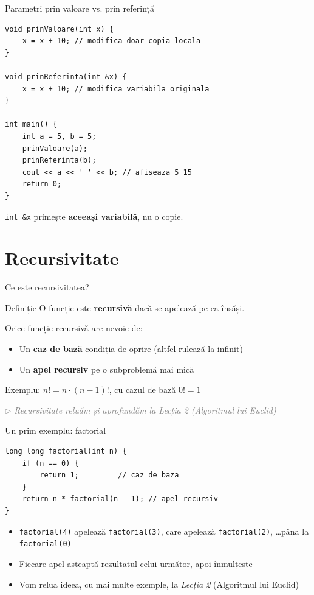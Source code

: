 ﻿\documentclass{beamer}
\begin{document}
\begin{frame}[fragile]{Parametri prin valoare vs. prin referință}
  \begin{lstlisting}
void prinValoare(int x) {
    x = x + 10; // modifica doar copia locala
}

void prinReferinta(int &x) {
    x = x + 10; // modifica variabila originala
}

int main() {
    int a = 5, b = 5;
    prinValoare(a);
    prinReferinta(b);
    cout << a << ' ' << b; // afiseaza 5 15
    return 0;
}
  \end{lstlisting}
  \lstinline|int &x| primește \textbf{aceeași variabilă}, nu o copie.
\end{frame}

\section{Recursivitate}

\begin{frame}{Ce este recursivitatea?}
  \begin{block}{Definiție}
    O funcție este \textbf{recursivă} dacă se apelează pe ea însăși.
  \end{block}

  \smallskip
  Orice funcție recursivă are nevoie de:
  \begin{itemize}
    \item Un \textbf{caz de bază} \textemdash{} condiția de oprire (altfel rulează la infinit)
    \item Un \textbf{apel recursiv} pe o subproblemă mai mică
  \end{itemize}

  \smallskip
  Exemplu: $n! = n \cdot (n-1)!$, cu cazul de bază $0! = 1$

  \vfill
  {\footnotesize\textcolor{gray}{\textit{$\triangleright$ Recursivitate \textemdash{} reluăm și aprofundăm la \emph{Lecția 2} (Algoritmul lui Euclid)}}}
\end{frame}

\begin{frame}[fragile]{Un prim exemplu: factorial}
  \begin{lstlisting}
long long factorial(int n) {
    if (n == 0) {
        return 1;         // caz de baza
    }
    return n * factorial(n - 1); // apel recursiv
}
  \end{lstlisting}
  \begin{itemize}
    \item \lstinline|factorial(4)| apelează \lstinline|factorial(3)|, care apelează \lstinline|factorial(2)|, \dots până la \lstinline|factorial(0)|
    \item Fiecare apel așteaptă rezultatul celui următor, apoi înmulțește
    \item Vom relua ideea, cu mai multe exemple, la \emph{Lecția 2} (Algoritmul lui Euclid)
  \end{itemize}
\end{frame}
\end{document}
